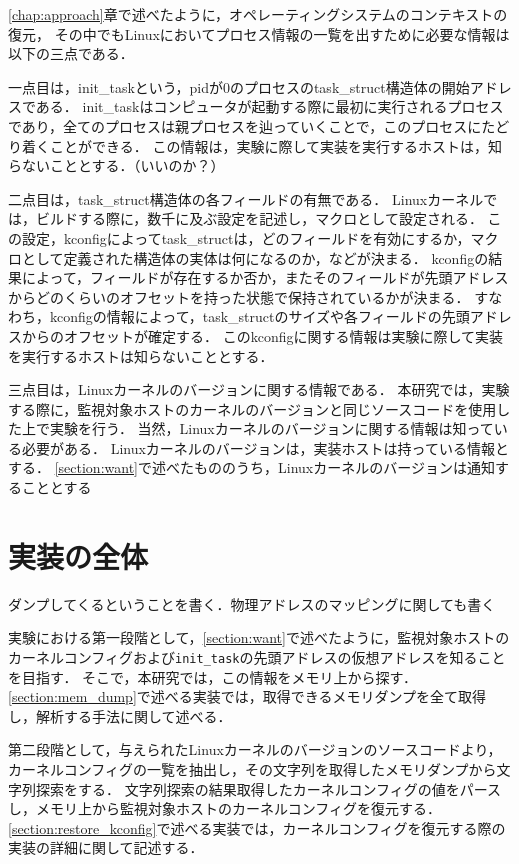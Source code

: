 \ref{chap:approach}章で述べたように，オペレーティングシステムのコンテキストの復元，
その中でもLinuxにおいてプロセス情報の一覧を出すために必要な情報は以下の三点である．

一点目は，init_taskという，pidが0のプロセスのtask\_struct構造体の開始アドレスである．
init_taskはコンピュータが起動する際に最初に実行されるプロセスであり，全てのプロセスは親プロセスを辿っていくことで，このプロセスにたどり着くことができる．
この情報は，実験に際して実装を実行するホストは，知らないこととする．（いいのか？）

二点目は，task\_struct構造体の各フィールドの有無である．
Linuxカーネルでは，ビルドする際に，数千に及ぶ設定を記述し，マクロとして設定される．
この設定，kconfigによってtask\_structは，どのフィールドを有効にするか，マクロとして定義された構造体の実体は何になるのか，などが決まる．
kconfigの結果によって，フィールドが存在するか否か，またそのフィールドが先頭アドレスからどのくらいのオフセットを持った状態で保持されているかが決まる．
すなわち，kconfigの情報によって，task\_structのサイズや各フィールドの先頭アドレスからのオフセットが確定する．
このkconfigに関する情報は実験に際して実装を実行するホストは知らないこととする．

三点目は，Linuxカーネルのバージョンに関する情報である．
本研究では，実験する際に，監視対象ホストのカーネルのバージョンと同じソースコードを使用した上で実験を行う．
当然，Linuxカーネルのバージョンに関する情報は知っている必要がある．
Linuxカーネルのバージョンは，実装ホストは持っている情報とする．
\ref{section:want}で述べたもののうち，Linuxカーネルのバージョンは通知することとする

\section{実装の全体}

ダンプしてくるということを書く．物理アドレスのマッピングに関しても書く

実験における第一段階として，\ref{section:want}で述べたように，監視対象ホストのカーネルコンフィグおよび\verb|init_task|の先頭アドレスの仮想アドレスを知ることを目指す．
そこで，本研究では，この情報をメモリ上から探す．\ref{section:mem_dump}で述べる実装では，取得できるメモリダンプを全て取得し，解析する手法に関して述べる．

第二段階として，与えられたLinuxカーネルのバージョンのソースコードより，カーネルコンフィグの一覧を抽出し，その文字列を取得したメモリダンプから文字列探索をする．
文字列探索の結果取得したカーネルコンフィグの値をパースし，メモリ上から監視対象ホストのカーネルコンフィグを復元する．
\ref{section:restore_kconfig}で述べる実装では，カーネルコンフィグを復元する際の実装の詳細に関して記述する．

